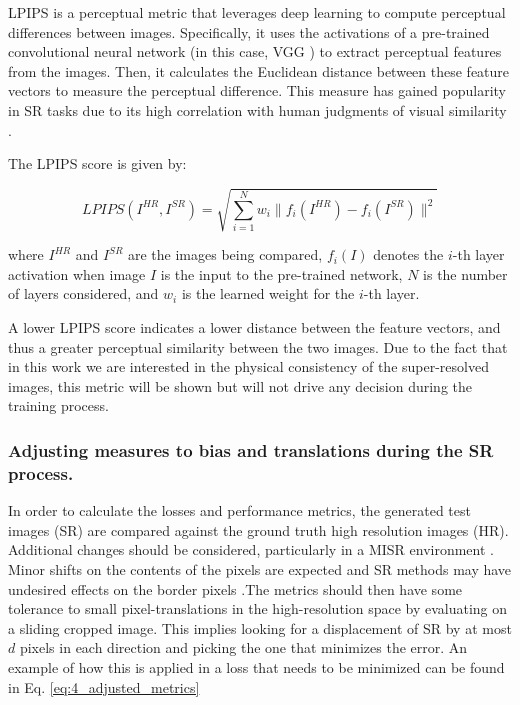         LPIPS is a perceptual metric that leverages deep learning to compute perceptual differences between images. Specifically, it uses the activations of a pre-trained convolutional neural network (in this case, VGG \cite{VGGnet} ) to extract perceptual features from the images. 
        Then, it calculates the Euclidean distance between these feature vectors to measure the perceptual difference.
        This measure has gained popularity in SR tasks due to its high correlation with human judgments of visual similarity \cite{zhang2018unreasonable}.
        
        The LPIPS score is given by:
        
        \begin{equation}
        LPIPS(I^{HR}, I^{SR}) = \sqrt{\sum_{i=1}^{N} w_i\|f_i(I^{HR})-f_i(I^{SR})\|^2}
        \end{equation}
        
        where $I^{HR}$ and $I^{SR}$ are the images being compared, $f_i(I)$ denotes the $i$-th layer activation when image $I$ is the input to the pre-trained network, $N$ is the number of layers considered, and $w_i$ is the learned weight for the $i$-th layer.
        
        A lower LPIPS score indicates a lower distance between the feature vectors, and thus a greater perceptual similarity between the two images. 
        Due to the fact that in this work we are interested in the physical consistency of the super-resolved images, 
        this metric will be shown but will not drive any decision during the training process.
        

        \subsubsection{Adjusting measures to bias and translations during the SR process.}\label{subsec:adjustedmetrics}
    
            In order to calculate the losses and performance metrics, the generated test images (SR) are compared against the ground truth high resolution images (HR).
            Additional changes should be considered, particularly in a MISR environment \cite{martens2019superresolution}.
            Minor shifts on the contents of the pixels are expected and  SR methods may have undesired effects on the border pixels .The metrics should then have some tolerance to small pixel-translations in the high-resolution space by evaluating on a sliding cropped image. 
            This implies looking for a displacement of SR by at most $d$ pixels in each direction and picking the one that minimizes the error. 
            An example of how this is applied in a loss that needs to be minimized can be found in Eq. \ref{eq:4_adjusted_metrics}
    
